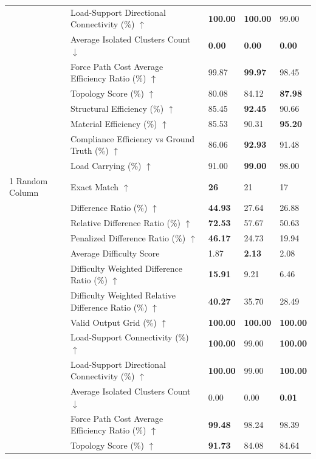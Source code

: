 \begin{table}[!h]
{\begin{tabular}{lllll}
 & Load-Support Directional Connectivity (\%) $\uparrow$ & \textbf{100.00} & \textbf{100.00} & 99.00 \\
 & Average Isolated Clusters Count $\downarrow$ & \textbf{0.00} & \textbf{0.00} & \textbf{0.00} \\
 & Force Path Cost Average Efficiency Ratio (\%) $\uparrow$ & 99.87 & \textbf{99.97} & 98.45 \\
 & Topology Score (\%) $\uparrow$ & 80.08 & 84.12 & \textbf{87.98} \\
 & Structural Efficiency (\%) $\uparrow$ & 85.45 & \textbf{92.45} & 90.66 \\
 & Material Efficiency (\%) $\uparrow$ & 85.53 & 90.31 & \textbf{95.20} \\
 & Compliance Efficiency vs Ground Truth (\%) $\uparrow$ & 86.06 & \textbf{92.93} & 91.48 \\
 & Load Carrying (\%) $\uparrow$ & 91.00 & \textbf{99.00} & 98.00 \\
1 Random Column & Exact Match $\uparrow$ & \textbf{26} & 21 & 17 \\
 & Difference Ratio (\%) $\uparrow$ & \textbf{44.93} & 27.64 & 26.88 \\
 & Relative Difference Ratio (\%) $\uparrow$ & \textbf{72.53} & 57.67 & 50.63 \\
 & Penalized Difference Ratio (\%) $\uparrow$ & \textbf{46.17} & 24.73 & 19.94 \\
 & Average Difficulty Score & 1.87 & \textbf{2.13} & 2.08 \\
 & Difficulty Weighted Difference Ratio (\%) $\uparrow$ & \textbf{15.91} & 9.21 & 6.46 \\
 & Difficulty Weighted Relative Difference Ratio (\%) $\uparrow$ & \textbf{40.27} & 35.70 & 28.49 \\
 & Valid Output Grid (\%) $\uparrow$ & \textbf{100.00} & \textbf{100.00} & \textbf{100.00} \\
 & Load-Support Connectivity (\%) $\uparrow$ & \textbf{100.00} & 99.00 & \textbf{100.00} \\
 & Load-Support Directional Connectivity (\%) $\uparrow$ & \textbf{100.00} & 99.00 & \textbf{100.00} \\
 & Average Isolated Clusters Count $\downarrow$ & 0.00 & 0.00 & \textbf{0.01} \\
 & Force Path Cost Average Efficiency Ratio (\%) $\uparrow$ & \textbf{99.48} & 98.24 & 98.39 \\
 & Topology Score (\%) $\uparrow$ & \textbf{91.73} & 84.08 & 84.64 \\

\end{tabular}}
\end{table}
